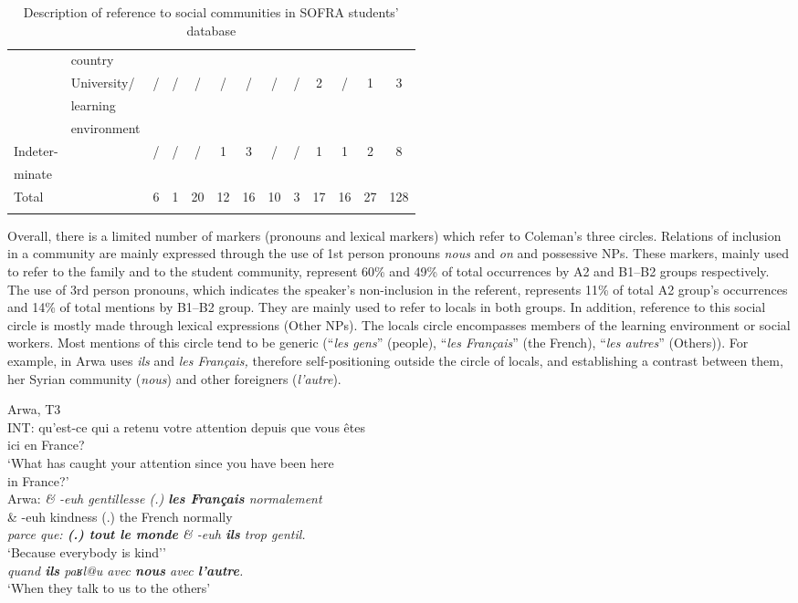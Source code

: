 \documentclass[output=paper]{langscibook}
\begin{document}
\begin{sidewaystable}
\begin{tabular}{llccccccccccc}
& {country} &  &  &  &  &  &  &  &  &  &  & \\
& {University/} & / & / & / & / & / & / & / & 2 & / & 1 & 3\\
& {learning} & & & & & & & & & & & \\
& {environment} & & & & & & & & & & & \\
\midrule
{Indeter-} &  & / & / & / & 1 & 3 & / & / & 1 & 1 & 2 & 8\\
{minate} &  & & & & & & & & & & & \\
\midrule
{Total} & & 6 & 1 & 20 & 12 & 16 & 10 & 3 & 17 & 16 & 27 & 128\\
\lspbottomrule
\end{tabular}
\caption{Description of reference to social communities in SOFRA students’ database}
\label{tab:saddour:4}
\end{sidewaystable}

Overall, there is a limited number of markers (pronouns and lexical markers) which refer to Coleman’s three circles. Relations of inclusion in a community are mainly expressed through the use of 1st person pronouns \textit{nous} and \textit{on} and possessive NPs. These markers, mainly used to refer to the family and to the student community, represent 60\% and 49\% of total occurrences by A2 and B1–B2 groups respectively. The use of 3rd person pronouns, which indicates the speaker’s non-inclusion in the referent, represents 11\% of total A2 group’s occurrences and 14\% of total mentions by B1–B2 group. They are mainly used to refer to locals in both groups. In addition, reference to this social circle is mostly made through lexical expressions (Other NPs). The locals circle encompasses members of the learning environment or social workers. Most mentions of this circle tend to be generic (“\textit{les gens}” (people), “\textit{les Français}” (the French), “\textit{les autres}” (Others)). For example, in  Arwa uses \textit{ils} and \textit{les Français,} therefore self-positioning outside the circle of locals, and establishing a contrast between them, her Syrian community (\textit{nous}) and other foreigners (\textit{l’autre}).

\TabPositions{1.5cm,3cm,5cm,7cm}
\ea%
    \label{ex:6}
    Arwa, T3\medskip\\
INT: \tab qu'est-ce qui a retenu votre attention depuis que vous êtes\\
\tab ici en France?\\
\tab `What has caught your attention since you have been here \\ \tab in France?'\\
Arwa: \tab \textit{\& -euh gentillesse 	(.) \textbf{les Français} normalement}\\
\tab \& -euh kindness (.) the French normally\\
\tab \textit{parce que: \textbf{(.) tout le monde} \& -euh \textbf{ils} trop gentil.}\\
\tab `Because everybody is kind''\\
\tab \textit{quand \textbf{ils} paʁl@u avec \textbf{nous} avec \textbf{l'autre}.}\\
\tab `When they talk to us to the others'
\z
\end{document}
